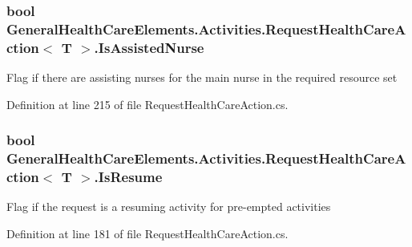 \subsubsection[{\texorpdfstring{Is\+Assisted\+Nurse}{IsAssistedNurse}}]{\setlength{\rightskip}{0pt plus 5cm}bool {\bf General\+Health\+Care\+Elements.\+Activities.\+Request\+Health\+Care\+Action}$<$ T $>$.Is\+Assisted\+Nurse\hspace{0.3cm}{\ttfamily [get]}}\hypertarget{class_general_health_care_elements_1_1_activities_1_1_request_health_care_action_ab4877c990e9a34766d623a08579d76f5}{}\label{class_general_health_care_elements_1_1_activities_1_1_request_health_care_action_ab4877c990e9a34766d623a08579d76f5}


Flag if there are assisting nurses for the main nurse in the required resource set 



Definition at line 215 of file Request\+Health\+Care\+Action.\+cs.

\subsubsection[{\texorpdfstring{Is\+Resume}{IsResume}}]{\setlength{\rightskip}{0pt plus 5cm}bool {\bf General\+Health\+Care\+Elements.\+Activities.\+Request\+Health\+Care\+Action}$<$ T $>$.Is\+Resume\hspace{0.3cm}{\ttfamily [get]}}\hypertarget{class_general_health_care_elements_1_1_activities_1_1_request_health_care_action_a223b90949b245905a50987038c05f454}{}\label{class_general_health_care_elements_1_1_activities_1_1_request_health_care_action_a223b90949b245905a50987038c05f454}


Flag if the request is a resuming activity for pre-\/empted activities 



Definition at line 181 of file Request\+Health\+Care\+Action.\+cs.

